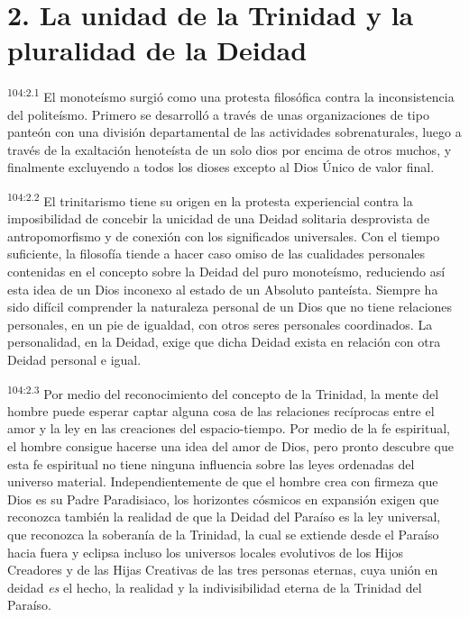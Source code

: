 \documentclass[twoside, 11pt]{book}
\begin{document}
\section*{2. La unidad de la Trinidad y la pluralidad de la Deidad}
\par
\textsuperscript{104:2.1} El monoteísmo surgió como una protesta filosófica contra la inconsistencia del politeísmo. Primero se desarrolló a través de unas organizaciones de tipo panteón con una división departamental de las actividades sobrenaturales, luego a través de la exaltación henoteísta de un solo dios por encima de otros muchos, y finalmente excluyendo a todos los dioses excepto al Dios Único de valor final.

\par
\textsuperscript{104:2.2} El trinitarismo tiene su origen en la protesta experiencial contra la imposibilidad de concebir la unicidad de una Deidad solitaria desprovista de antropomorfismo y de conexión con los significados universales. Con el tiempo suficiente, la filosofía tiende a hacer caso omiso de las cualidades personales contenidas en el concepto sobre la Deidad del puro monoteísmo, reduciendo así esta idea de un Dios inconexo al estado de un Absoluto panteísta. Siempre ha sido difícil comprender la naturaleza personal de un Dios que no tiene relaciones personales, en un pie de igualdad, con otros seres personales coordinados. La personalidad, en la Deidad, exige que dicha Deidad exista en relación con otra Deidad personal e igual.

\par
\textsuperscript{104:2.3} Por medio del reconocimiento del concepto de la Trinidad, la mente del hombre puede esperar captar alguna cosa de las relaciones recíprocas entre el amor y la ley en las creaciones del espacio-tiempo. Por medio de la fe espiritual, el hombre consigue hacerse una idea del amor de Dios, pero pronto descubre que esta fe espiritual no tiene ninguna influencia sobre las leyes ordenadas del universo material. Independientemente de que el hombre crea con firmeza que Dios es su Padre Paradisiaco, los horizontes cósmicos en expansión exigen que reconozca también la realidad de que la Deidad del Paraíso es la ley universal, que reconozca la soberanía de la Trinidad, la cual se extiende desde el Paraíso hacia fuera y eclipsa incluso los universos locales evolutivos de los Hijos Creadores y de las Hijas Creativas de las tres personas eternas, cuya unión en deidad \textit{es} el hecho, la realidad y la indivisibilidad eterna de la Trinidad del Paraíso.
\end{document}
